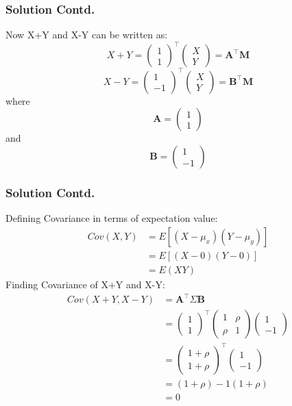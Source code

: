 \documentclass{beamer}
\renewcommand{\vec}[1]{\mathbf{#1}}
\newcommand{\myvec}[1]{\ensuremath{\begin{pmatrix}#1\end{pmatrix}}}
\begin{document}
\begin{frame}
 \frametitle{Solution Contd.}
     Now X+Y and X-Y can be written as:
    \begin{equation}
        X+Y = \myvec{1 \\ 1} ^\top
                \myvec{X \\ Y}
        = \vec{A^\top} \vec{M}
    \end{equation}
    \begin{equation}
        X-Y = \myvec{1 \\ -1} ^\top
                \myvec{X \\ Y}
        =\vec{B^\top} \vec{M}
    \end{equation}
    where
    \begin{equation}
     \vec{A} = \myvec{1 \\ 1}
    \end{equation}
    and
    \begin{equation}
        \vec{B} = \myvec{1 \\ -1}
    \end{equation}
\end{frame}

\begin{frame}
  \frametitle{Solution Contd.} 
  Defining Covariance in terms of expectation value:
    \begin{align}
        Cov(X,Y) &= E[(X-\mu_x)(Y-\mu_y)] \\
        &= E[(X-0)(Y-0)]\\
        &= E(XY)
    \end{align}
 Finding Covariance of X+Y and X-Y:
    \begin{align}
     Cov(X+Y,X-Y) &= \vec{A^\top} \Sigma \vec{B} \\
        &= \myvec{1 \\ 1}^\top
        \begin{pmatrix}
                1 & \rho\\
                \rho & 1 
            \end{pmatrix}
            \myvec{1 \\ -1}\\ 
        &= \myvec{1+\rho \\ 1+\rho}^\top
            \myvec{1 \\ -1}\\
        &= (1+\rho)-1(1+\rho) \\
        &=   0
    \end{align}
\end{frame}
\end{document}
